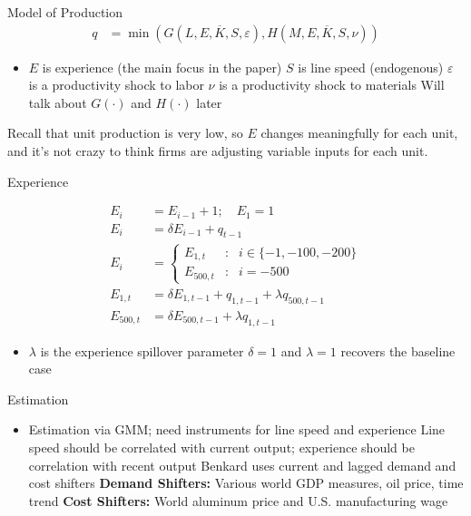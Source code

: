 \documentclass[dvipsnames]{beamer}
\begin{document}
%
\begin{frame}{Model of Production}
  \vspace{-3em}
  \begin{align*}
    q &= \min (G(L, E, \overline{K}, S, \varepsilon),
        H(M, E, \overline{K}, S, \nu )) \tag{Leontief} 
  \end{align*}
  \vspace{-1em}
  \begin{itemize}
  \item $E$ is experience (the main focus in the paper)
    \vitem $S$ is line speed (endogenous)
    \vitem $\varepsilon$ is a productivity shock to labor
    \vitem $\nu$ is a productivity shock to materials
    \vitem Will talk about $G(\cdot)$ and $H(\cdot)$ later
  \end{itemize}
  \vfill
  Recall that unit production is very low, so $E$ changes meaningfully for each unit, and it's not crazy to think firms are adjusting variable inputs for each unit.
\end{frame}
%
\begin{frame}{Experience}
\begin{fleqn}[0pt]
  \begin{align*}
    E_i &= E_{i - 1} + 1; \quad E_{1} = 1 \tag{baseline}\\[2em]
    E_i &= \delta E_{i - 1} + q_{t - 1} \tag{with forgetting}\\[2em]
    E_i &= \left\{
          \begin{array}{lcl}
            E_{1, t}& : & i \in \{-1, -100, -200\}\\
            E_{500, t} & : & i = -500
          \end{array}\right. \tag{inc. spillovers}\\[1em]
    E_{1, t} &= \delta E_{1, t - 1} + q_{1, t - 1} + \lambda q_{500, t - 1}\\
    E_{500, t} &= \delta E_{500, t - 1} + \lambda q_{1, t - 1}
  \end{align*}
  \end{fleqn}
  \begin{itemize}
  \item $\lambda$ is the experience spillover parameter
    \vitem $\delta = 1$ and $\lambda =1$ recovers the baseline case
  \end{itemize}
\end{frame}
%
\begin{frame}{Estimation}
  \begin{itemize}
  \item Estimation via GMM; need instruments for line speed and experience
   \vitem Line speed should be correlated with current output; experience should be correlation with recent output 
   \vitem Benkard uses current and lagged demand and cost shifters
   \vitem \textbf{Demand Shifters:} Various world GDP measures, oil price, time trend
   \vitem \textbf{Cost Shifters:} World aluminum price and U.S. manufacturing wage
  \end{itemize}
\end{frame}
\end{document}
